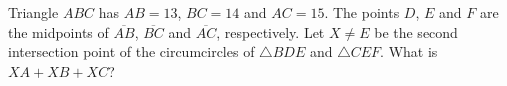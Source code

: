 Triangle $ABC$ has $AB=13$, $BC=14$ and $AC=15$. The points $D$, $E$ and $F$ are the midpoints of $\overline{AB}$, $\overline{BC}$ and $\overline{AC}$, respectively. Let $X\ne E$ be the second intersection point of the circumcircles of $\triangle BDE$ and $\triangle CEF$. What is $XA+XB+XC$?
